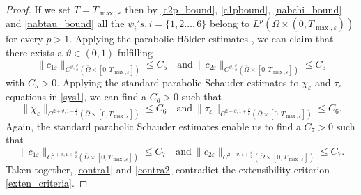 \documentclass[a4paper,10pt]{article}
\theoremstyle{definition}
\begin{document}
\begin{proof}
  \noindent
  If we set $T = T_{\max, \varepsilon}$ then by  \eqref{c2p_bound}, \eqref{c1pbound}, \eqref{nabchi_bound} and \eqref{nabtau_bound} all the $\psi_i's, i = \{1, 2 \ldots, 6\}$ belong to $L^p(\Omega \times (0, T_{\max, \varepsilon}))$ for every $p > 1$. Applying the parabolic H\"{o}lder estimates \cite[Theorem 1.3 and Remark 1.4]{ladyzhenskaia1968linear}, we can claim that there exists a $\vartheta \in (0, 1)$ fulfilling
\begin{equation*}
  \|c_{1\varepsilon}\|_{C^{\vartheta, \frac{\vartheta}{2}}(\bar{\Omega} \times [0, T_{\max, \varepsilon}])} \leq C_5 \quad \text{and}~ \|c_{2\varepsilon}\|_{C^{\vartheta, \frac{\vartheta}{2}}(\bar{\Omega} \times [0, T_{\max, \varepsilon}])} \leq C_5
\end{equation*}
with $C_5 > 0$. Applying the standard parabolic Schauder estimates \cite{ladyzhenskaia1968linear} to $\chi_\varepsilon$ and $\tau_\varepsilon$ equations in \eqref{sys1}, we can find a $C_6 > 0$ such that
\begin{equation}
\label{contra1}
  \|\chi_{\varepsilon}\|_{C^{2 + \vartheta, 1 + \frac{\vartheta}{2}}(\bar{\Omega} \times [0, T_{\max, \varepsilon}])} \leq C_6 \quad \text{and}~ \|\tau_{\varepsilon}\|_{C^{2 + \vartheta , 1 + \frac{\vartheta}{2}}(\bar{\Omega} \times [0, T_{\max, \varepsilon}])} \leq C_6.
\end{equation}
Again, the standard parabolic Schauder estimates enable us to find a $C_7 > 0$ such that
\begin{equation}
\label{contra2}
  \|c_{1\varepsilon}\|_{C^{2 + \vartheta, 1 + \frac{\vartheta}{2}}(\bar{\Omega} \times [0, T_{\max, \varepsilon}])} \leq C_7 \quad \text{and}~ \|c_{2\varepsilon}\|_{C^{2 + \vartheta , 1 + \frac{\vartheta}{2}}(\bar{\Omega} \times [0, T_{\max, \varepsilon}])} \leq C_7.
\end{equation}
Taken together, \eqref{contra1} and \eqref{contra2} contradict the extensibility criterion \eqref{exten_criteria}.


\end{proof}


\end{document}
